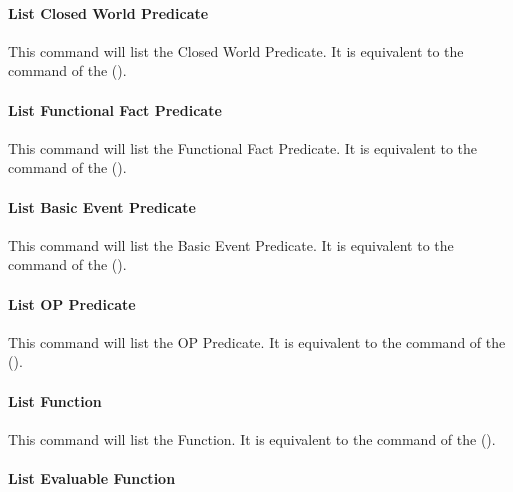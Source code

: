 \paragraph{List Closed World Predicate}

This command will list the Closed World Predicate. It is equivalent to the
 command of the \CPK{} (). 

\paragraph{List Functional Fact Predicate}

This command will list the Functional Fact Predicate. It is equivalent to the 
command of the \CPK{} ().

\paragraph{List Basic Event Predicate}

This command will list the Basic Event Predicate. It is equivalent to the
 command of the \CPK{} (). 

\paragraph{List OP Predicate}

This command will list the OP Predicate. It is equivalent to the  command of the \CPK{} ().

\paragraph{List Function}

This command will list the Function. It is equivalent to the  command of the \CPK{} ().

\paragraph{List Evaluable Function}

